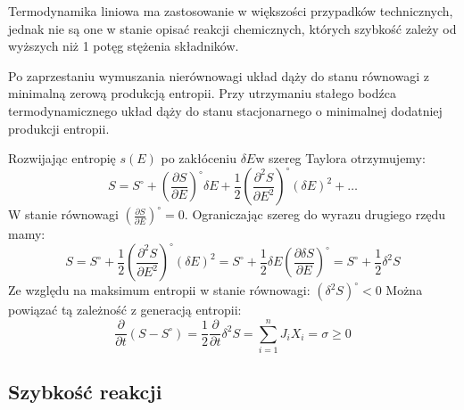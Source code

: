 \documentclass[10pt, a4paper, twoside, onecolumn]{article}
\numberwithin{equation}{section}
\begin{document}
	Termodynamika liniowa ma zastosowanie w większości przypadków technicznych, jednak nie są one w stanie opisać reakcji chemicznych, których szybkość zależy od wyższych niż 1 potęg stężenia składników. \par
	Po zaprzestaniu wymuszania nierównowagi układ dąży do stanu równowagi z minimalną zerową produkcją entropii. Przy utrzymaniu stałego bodźca termodynamicznego układ dąży do stanu stacjonarnego o minimalnej dodatniej produkcji entropii. \par
	Rozwijając entropię \(s\left(E\right)\) po zakłóceniu \(\delta E\)w szereg Taylora otrzymujemy:
	\begin{equation}
		S=S^\circ+\left(\frac{\partial S}{\partial E}\right)^\circ \delta E+\frac{1}{2}\left(\frac{\partial^{2}S}{\partial E^{2}}\right)^\circ \left(\delta E\right)^2 + \ldots
	\end{equation}
	W stanie równowagi \(\left(\frac{\partial S}{\partial E}\right)^\circ=0\). Ograniczając szereg do wyrazu drugiego rzędu mamy:
	\begin{equation}
		S=S^\circ+\frac{1}{2}\left(\frac{\partial^{2}S}{\partial E^{2}}\right)^\circ \left(\delta E\right)^2=S^\circ+\frac{1}{2} \delta E\left(\frac{\partial \delta S}{\partial E}\right)^\circ=S^\circ+\frac{1}{2}\delta^{2}S
	\end{equation}
	Ze względu na maksimum entropii w stanie równowagi: \(\left(\delta^2 S\right)^\circ<0\)
	Można powiązać tą zależność z generacją entropii: 
	\begin{equation}
		\frac{\partial}{\partial t}\left(S-S^\circ\right)=\frac{1}{2}\frac{\partial}{\partial t}\delta^2 S=\sum_{i=1}^{n}J_{i}X_{i}=\sigma\geq0
	\end{equation}
	\subsection{Szybkość reakcji}
	
\end{document}
